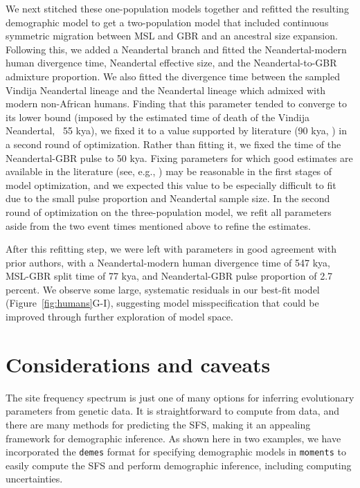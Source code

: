 \documentclass[]{article}
\newcommand{\moments}{\texttt{moments}\xspace}
\newcommand{\demes}{\texttt{demes}\xspace}
\begin{document}
We next stitched these one-population models together and refitted the 
resulting demographic model to get a two-population model 
that included continuous symmetric 
migration between MSL and GBR and an ancestral size expansion. Following this,
we added a Neandertal branch and fitted the 
Neandertal-modern human divergence time, Neandertal effective size, and the 
Neandertal-to-GBR admixture proportion. We also fitted the divergence time 
between the sampled Vindija Neandertal lineage and the Neandertal lineage which 
admixed with modern non-African humans. Finding that this parameter tended to 
converge to its lower bound (imposed by the estimated time of death of the 
Vindija Neandertal, ~55 kya), we fixed it to a value supported by literature 
(90 kya, \cite{prufer2017high}) in a second round of optimization.
Rather than fitting it, we fixed the time of the Neandertal-GBR pulse to 50 kya.
Fixing parameters for which good estimates are available in the literature 
(see, e.g., \cite{sumer2025earliest}) may be reasonable in the first stages of 
model optimization, and we expected this value to be especially difficult to fit 
due to the small pulse proportion and Neandertal sample size. In the second 
round of optimization on the three-population model, we refit all parameters 
aside from the two event times mentioned above to refine the estimates. 

After this refitting step, we were left with parameters in good agreement with 
prior authors, with a Neandertal-modern human divergence time of 547 kya, 
MSL-GBR split time of 77 kya, and Neandertal-GBR pulse proportion of 2.7 
percent. We observe some large, systematic residuals in our best-fit model 
(Figure~\ref{fig:humans}G-I), suggesting model misspecification that could be
improved through further exploration of model space.


\section*{Considerations and caveats}\label{sec:conclusions}

The site frequency spectrum is just one of many options for inferring
evolutionary parameters from genetic data. It is straightforward to compute
from data, and there are many methods for predicting the SFS, making it an
appealing framework for demographic inference. As shown here in two examples,
we have incorporated the \demes format for specifying demographic models in
\moments to easily compute the SFS and perform demographic inference, including
computing uncertainties.
\end{document}
